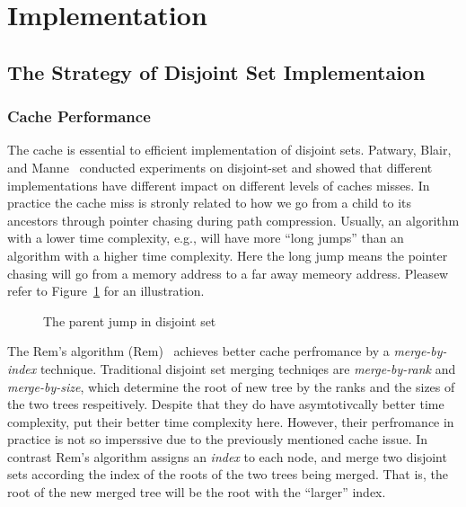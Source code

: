 \section{Implementation} \label{sec:Implementation}

\subsection{The Strategy of Disjoint Set Implementaion}


\subsubsection{Cache Performance}

The cache is essential to efficient implementation of disjoint sets.
Patwary, Blair, and Manne~\cite{Patwary2010ExperimentsOU} conducted
experiments on disjoint-set and showed that different implementations
have different impact on different levels of caches misses.  In
practice the cache miss is stronly related to how we go from a child
to its ancestors through pointer chasing during path compression.
Usually, an algorithm with a lower time complexity, e.g.,  will have more
``long jumps'' than an algorithm with a higher time complexity.  Here
the long jump means the pointer chasing will go from a memory address
to a far away memeory address.  Pleasew refer to
Figure~\ref{fig:long-short-jump-disjoint} for an illustration.

\begin{figure}[!thb]
  \centering {} 
  \caption{The parent jump in disjoint set}
  \label{fig:long-short-jump-disjoint}
\end{figure}


The Rem's algorithm ({\sc Rem})~\cite{dijkstra1976a} achieves better
cache perfromance by a {\em merge-by-index} technique.  Traditional
disjoint set merging techniqes are {\em merge-by-rank}\cite{XXX} and
{\em merge-by-size}\cite{XXX}, which determine the root of new tree by
the ranks and the sizes of the two trees respeitively.  Despite that
they do have asymtotivcally better time complexity, put their better
time complexity here.  However, their perfromance in practice is not
so imperssive due to the previously mentioned cache issue.  In
contrast Rem's algorithm assigns an {\em index} to each node, and
merge two disjoint sets according the index of the roots of the two
trees being merged.  That is, the root of the new merged tree will be
the root with the ``larger'' index.

